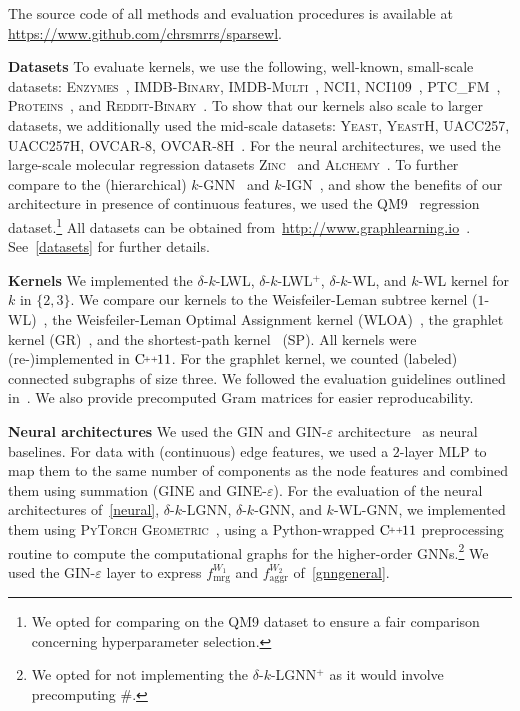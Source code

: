 \documentclass{article}
\newcommand{\xhdr}[1]{{\noindent\bfseries #1}}
\theoremstyle{definition}
\newcommand{\CC}[1][]{$\text{C\hspace{-.25ex}}^{_{_{_{++}}}}
	\ifthenelse{\equal{#1}{}}{}{\text{\hspace{-.625ex}#1}}$}
\newcommand{\wl}{$1$-\textsf{WL}\xspace}
\newcommand{\kwl}{$k$-\textsf{WL}\xspace}
\newcommand{\deltakwl}{$\delta$-$k$-\textsf{WL}\xspace}
\newcommand{\localkwl}{$\delta$-$k$-\textsf{LWL}\xspace}
\newcommand{\pluskwl}{$\delta$-$k$-\textsf{LWL}$^+$\xspace}
\newcommand{\deltakwln}{$\delta$-$k$-\textsf{GNN}\xspace}
\newcommand{\localkwln}{$\delta$-$k$-\textsf{LGNN}\xspace}
\newcommand{\kwln}{$k$-\textsf{WL-GNN}\xspace}
\newcommand{\kgnn}{$k$\textrm{-}\textsf{GNN}\xspace}
\newcommand{\kign}{$k$\textrm{-}\textsf{IGN}\xspace}
\newcommand{\shp}{\textsf{SP}\xspace}
\newcommand{\gr}{\textsf{GR}\xspace}
\newcommand{\wloa}{\textsf{WLOA}\xspace}
\newcommand{\gin}{\textsf{GIN}\xspace}
\newcommand{\gine}{\textsf{GINE}\xspace}
\newcommand{\gineps}{\textsf{GIN-$\varepsilon$}\xspace}
\newcommand{\gineeps}{\textsf{GINE-$\varepsilon$}\xspace}
\begin{document}
The source code of all methods and evaluation procedures is available at \url{https://www.github.com/chrsmrrs/sparsewl}. 

\xhdr{Datasets} To evaluate kernels, we use the following, well-known, small-scale datasets: \textsc{Enzymes}~\cite{Sch+2004,Bor+2005}, \textsc{IMDB-Binary}, \textsc{IMDB-Multi}~\cite{Yan+2015a}, \textsc{NCI1}, \textsc{NCI109}~\cite{Wal+2008}, \textsc{PTC\_FM}~\cite{Hel+2001}, \textsc{Proteins}~\cite{Dob+2003,Bor+2005}, and \textsc{Reddit-Binary}~\cite{Yan+2015a}. To show that our kernels also scale to larger datasets, we additionally used the mid-scale datasets: \textsc{Yeast}, \textsc{YeastH}, \textsc{UACC257}, \textsc{UACC257H}, \textsc{OVCAR-8}, \textsc{OVCAR-8H}~\cite{Yan+2008}. For the neural architectures, we used the large-scale molecular regression datasets \textsc{Zinc}~\cite{Dwi+2020,Jin+2018a} and \textsc{Alchemy}~\cite{Che+2020}.
To further compare to the (hierarchical) \kgnn~\cite{Mor+2019} and \kign~\cite{Mar+2019}, and show the benefits of our architecture in presence of continuous features, we used the \textsc{QM9}~\cite{Ram+2014,Wu+2018} regression dataset.\footnote{We opted for comparing on the \textsc{QM9} dataset to ensure a fair comparison concerning hyperparameter selection.}  All datasets can be obtained from~\url{http://www.graphlearning.io}~\cite{Mor+2020}. See~\cref{datasets} for further details.

\xhdr{Kernels} We implemented the \localkwl, \pluskwl, \deltakwl, and  \kwl kernel for $k$ in $\{2,3\}$. We compare our kernels to the Weisfeiler-Leman subtree kernel (\wl)~\cite{She+2011}, the Weisfeiler-Leman Optimal Assignment kernel (\wloa)~\cite{Kri+2016}, the graphlet kernel (\gr)~\cite{She+2009}, and the shortest-path kernel~\cite{Bor+2005} (\shp). All kernels were (re-)implemented in \CC[11]. For the graphlet kernel, we counted (labeled) connected subgraphs of size three. We followed the evaluation guidelines outlined in~\cite{Mor+2020}. We also provide precomputed Gram matrices for easier reproducability.

\xhdr{Neural architectures} We used the \gin and \gineps architecture~\cite{Xu+2018b} as neural baselines. For data with (continuous) edge features, we used a $2$-layer MLP to map them to the same number of components as the node features and combined them using summation (\gine and \gineeps). For the evaluation of the neural architectures of~\cref{neural}, \localkwln, \deltakwln, and \kwln, we implemented them using \textsc{PyTorch Geometric}~\cite{Fey+2019}, using a  Python-wrapped \CC[11] preprocessing routine to compute the computational graphs for the higher-order GNNs.\footnote{We opted for not  implementing the \localkwln$\!\!^+$ as it would involve precomputing $\#$.} We used the \gineps layer to express $f^{W_1}_{\text{mrg}}$ and $f^{W_2}_{\text{aggr}}$ of~\cref{gnngeneral}. 
\end{document}
